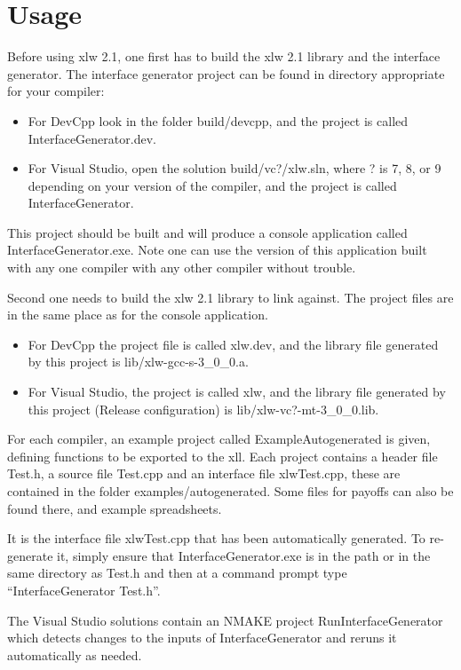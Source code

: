 \documentclass[12pt,reqno]{amsart}
\numberwithin{equation}{section}
\numberwithin{figure}{section}
\begin{document}
\section{Usage}

Before using xlw 2.1, one first has to build the xlw 2.1 library and
the interface generator. The interface generator project can be found
in directory appropriate for your compiler:
\begin{itemize}
\item For DevCpp look in the folder build/devcpp, and the project is
  called InterfaceGenerator.dev.
\item For Visual Studio, open the solution build/vc?/xlw.sln, where
  ? is 7, 8, or 9 depending on your version of the compiler, and the
  project is called InterfaceGenerator. 
\end{itemize}
This project should be built and will produce a console application
called InterfaceGenerator.exe. Note one can use the version of this
application built with any one compiler with any other compiler
without trouble. 

Second one needs to build the xlw 2.1 library to link against. The
project files are in the same place as for the console application. 
\begin{itemize}
\item For DevCpp the project file is called xlw.dev, and the library
  file generated by this project is lib/xlw-gcc-s-3\_0\_0.a.
\item For Visual Studio, the project is called xlw, and the library
  file generated by this project (Release configuration) is 
  lib/xlw-vc?-mt-3\_0\_0.lib.
\end{itemize}

For each compiler, an example project called ExampleAutogenerated is given,
defining functions to be exported to the xll.  Each project contains a header
file Test.h, a source file Test.cpp and an interface file xlwTest.cpp, these
are contained in the folder examples/autogenerated. Some files for payoffs can
also be found there, and example spreadsheets. 

It is the interface file xlwTest.cpp that has been automatically generated. To
re-generate it, simply ensure that InterfaceGenerator.exe is in the path or in
the same directory as Test.h and then at a command prompt type
``InterfaceGenerator Test.h''. 

The Visual Studio solutions contain an NMAKE project RunInterfaceGenerator
which detects changes to the inputs of InterfaceGenerator and reruns it
automatically as needed.
\end{document}
